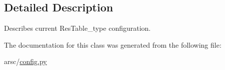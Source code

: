 \subsection{Detailed Description}
Describes current Res\+Table\+\_\+type configuration. 

The documentation for this class was generated from the following file\+:\begin{DoxyCompactItemize}
\item 
arsc/\mbox{\hyperlink{config_8py}{config.\+py}}\end{DoxyCompactItemize}
